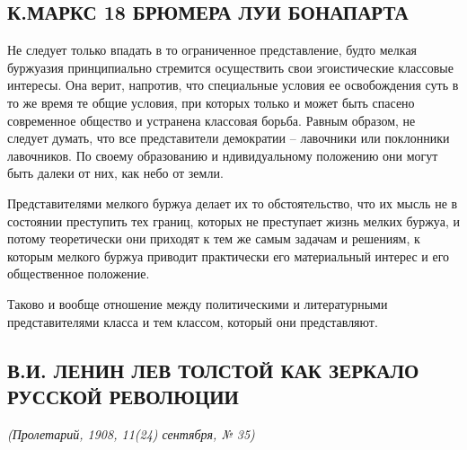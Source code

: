 \documentclass[12pt]{article}
\newcommand{\parnum}{(\arabic{parcount})}
\newcounter{parcount}
\newenvironment{parnumbers}{%
  \par%
  \everypar{\noindent \stepcounter{parcount}\marginpar[]{\parnum}}%
}{}
\begin{document}
\subsection{К.МАРКС 18 БРЮМЕРА ЛУИ БОНАПАРТА}

\begin{parnumbers}
Не следует только впадать в то ограниченное представление, будто мелкая буржуазия принципиально стремится осуществить свои эгоистические классовые интересы. Она верит, напротив, что специальные условия ее освобождения суть в то же время те общие условия, при которых только и может быть спасено современное общество и устранена классовая борьба. Равным образом, не следует думать, что все представители демократии -- лавочники или поклонники лавочников. По своему образованию и ндивидуальному положению они могут быть далеки от них, как небо от земли.

Представителями мелкого буржуа делает их то обстоятельство, что их мысль не в состоянии преступить тех границ, которых не преступает жизнь мелких буржуа, и потому теоретически они приходят к тем же самым задачам и решениям, к которым мелкого буржуа приводит практически его материальный интерес и его общественное положение.

Таково и вообще отношение между политическими и литературными представителями класса и тем классом, который они представляют.
\end{parnumbers}

\subsection{В.И. ЛЕНИН ЛЕВ ТОЛСТОЙ КАК ЗЕРКАЛО РУССКОЙ РЕВОЛЮЦИИ}
\textit{(Пролетарий, 1908, 11(24) сентября, № 35)}
\end{document}
